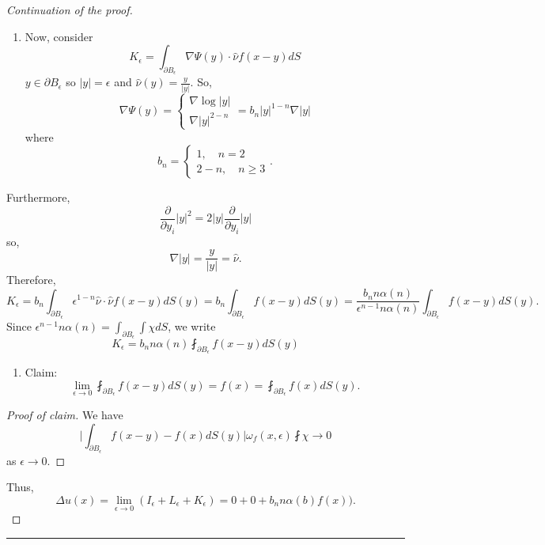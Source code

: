 \documentclass[11pt]{amsart}%
\begin{document}
\begin{proof}[Continuation of the proof]
\begin{enumerate}
\def\labelenumi{\arabic{enumi}.}
\setcounter{enumi}{5}

\item
  Now, consider
  \[K_\epsilon=\int_{\partial B_\epsilon} \nabla \Psi(y)\cdot \hat{\nu} f(x-y)dS\]
  \(y\in\partial B_\epsilon\) so \(\vert y\vert =\epsilon\) and
  \(\hat{\nu}(y)=\frac{y}{\vert y\vert}\). So,
  \[\nabla \Psi(y)=\begin{cases} \nabla \log\vert y\vert\\
  \nabla \vert y\vert^{2-n}\end{cases}=b_n \vert y\vert^{1-n}\nabla\vert y\vert\]
  where \[b_n=\begin{cases} 1, \quad n=2\\
  2-n, \quad n\ge 3\end{cases}.\]
\end{enumerate}

Furthermore,
\[\frac{\partial}{\partial y_i}\vert y\vert^2=2\vert y\vert \frac{\partial}{\partial y_i}\vert y\vert\]
so, \[\nabla \vert y\vert =\frac{y}{\vert y\vert} =\hat{\nu}.\]
Therefore,
\[K_\epsilon=b_n\int_{\partial B_\epsilon}\epsilon^{1-n}\hat{\nu}\cdot \hat{\nu}f(x-y)dS(y)=b_n\int_{\partial B_\epsilon} f(x-y)dS(y) = \frac{b_n n\alpha(n)}{\epsilon^{n-1}n\alpha(n)}\int_{\partial B_\epsilon}f(x-y)dS(y).\]
Since
\(\epsilon^{n-1}n\alpha(n)=\int_{\partial B_\epsilon}\int \chi dS\), we
write
\[K_\epsilon =b_n n\alpha(n)\fint_{\partial B_\epsilon}f(x-y)dS(y)\]

\begin{enumerate}
\def\labelenumi{\arabic{enumi}.}
\setcounter{enumi}{6}

\item
  Claim:
  \[\lim_{\epsilon\to0} \fint_{\partial B_\epsilon} f(x-y)dS(y)=f(x) = \fint_{\partial B_\epsilon}f(x)dS(y).\]
\end{enumerate}

\begin{proof}[Proof of claim] We have
\[\vert \int_{\partial B_\epsilon} f(x-y)-f(x) dS(y)\vert \omega_f(x,\epsilon)\fint \chi \to 0\]
as \(\epsilon \to 0\).
\end{proof}
Thus,
\[\Delta u(x)=\lim_{\epsilon\to 0}(I_\epsilon+L_\epsilon+K_\epsilon)=0+0+b_n n\alpha(b)f(x)).\]
\end{proof}

\begin{center}\rule{0.5\linewidth}{\linethickness}\end{center}
\end{document}
